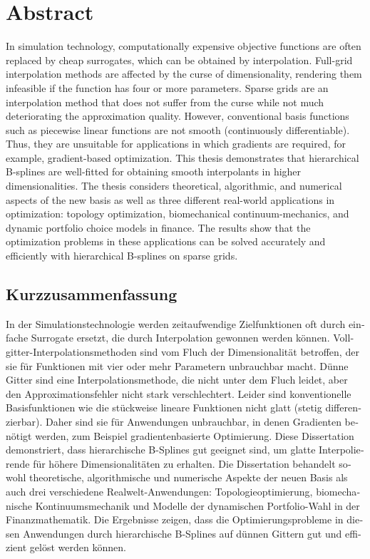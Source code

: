 
\section*{Abstract}

In simulation technology, computationally expensive objective
functions are often replaced
by cheap surrogates, which can be obtained by interpolation.
Full-grid interpolation methods are affected by the curse of dimensionality,
rendering them infeasible if the function has four or more parameters.
Sparse grids are an interpolation method that does not suffer from the
curse while not much deteriorating the approximation quality.
However, conventional basis functions such as piecewise linear functions
are not smooth (continuously differentiable).
Thus, they are unsuitable for applications in which gradients are required,
for example, gradient-based optimization.
This thesis demonstrates that hierarchical B-splines are well-fitted for
obtaining smooth interpolants in higher dimensionalities.
The thesis considers theoretical, algorithmic, and numerical aspects of the
new basis as well as three different real-world applications in optimization:
topology optimization, biomechanical continuum-mechanics, and
dynamic portfolio choice models in finance.
The results show that the optimization problems in these applications
can be solved accurately and efficiently with hierarchical B-splines on
sparse grids.

\begin{otherlanguage}{ngerman}
  \section*{Kurzzusammenfassung}
  
  In der Simulationstechnologie werden zeitaufwendige Zielfunktionen
  oft durch einfache Surrogate ersetzt, die durch Interpolation
  gewonnen werden können.
  Vollgitter-Interpolationsmethoden sind vom Fluch der
  Dimensionalität betroffen, der sie für Funktionen mit vier oder mehr
  Parametern unbrauchbar macht.
  Dünne Gitter sind eine Interpolationsmethode, die nicht unter
  dem Fluch leidet, aber den Approximationsfehler nicht stark verschlechtert.
  Leider sind konventionelle Basisfunktionen wie die stückweise
  lineare Funktionen nicht glatt (stetig differenzierbar).
  Daher sind sie für Anwendungen unbrauchbar, in denen Gradienten
  benötigt werden, zum Beispiel gradientenbasierte Optimierung.
  Diese Dissertation demonstriert, dass hierarchische B-Splines gut
  geeignet sind, um glatte Interpolierende für höhere
  Dimensionalitäten zu erhalten.
  Die Dissertation behandelt sowohl theoretische, algorithmische und numerische
  Aspekte der neuen Basis als auch drei verschiedene
  Realwelt-Anwendungen:
  Topologieoptimierung, biomechanische Kontinuumsmechanik und
  Modelle der dynamischen Portfolio-Wahl in der Finanzmathematik.
  Die Ergebnisse zeigen, dass die Optimierungsprobleme in diesen
  Anwendungen durch hierarchische B-Splines auf dünnen Gittern
  gut und effizient gelöst werden können.
\end{otherlanguage}
